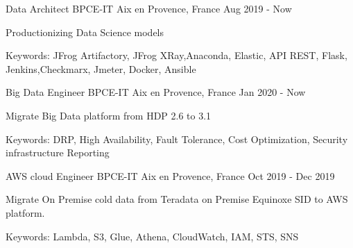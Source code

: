 

\begin{cventries}


  \cventry
    {Data Architect} %
    {BPCE-IT} %
    {Aix en Provence, France} %
    {Aug 2019 - Now} %
    {
      \begin{cvitems} %
        \item {Productionizing Data Science models}
        \item {Keywords: JFrog Artifactory, JFrog XRay,Anaconda, Elastic, API REST, Flask, Jenkins,Checkmarx, Jmeter, Docker, Ansible }
      \end{cvitems}
    }
    
  \cventry
    {Big Data Engineer} %
    {BPCE-IT} %
    {Aix en Provence, France} %
    {Jan 2020 - Now} %
    {
      \begin{cvitems} %
       \item { Migrate Big Data platform from HDP 2.6 to 3.1}
        \item {Keywords: DRP, High Availability, Fault Tolerance, Cost Optimization, Security infrastructure  Reporting }
      \end{cvitems}
    }
  \cventry
    {AWS cloud Engineer} %
    {BPCE-IT} %
    {Aix en Provence, France} %
    {Oct 2019 - Dec 2019} %
    {
      \begin{cvitems} %
       \item { Migrate On Premise cold data from Teradata on Premise Equinoxe SID to AWS platform.}
        \item {Keywords: Lambda, S3, Glue, Athena, CloudWatch, IAM, STS, SNS}
      \end{cvitems}
    }
    


\end{cventries}
